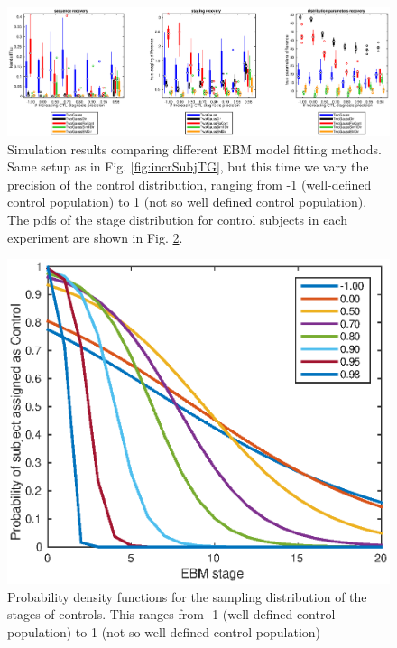 \begin{figure}[H]
 \hspace{-2cm}
 \includegraphics[scale=\simFigScale]{images/ebm/synthetic/metricsTwoGauss_incrCtlPrec.eps}
 \caption{Simulation results comparing different EBM model fitting methods. Same setup as in Fig. \ref{fig:incrSubjTG}, but this time we vary the precision of the control distribution, ranging from -1 (well-defined control population) to 1 (not so well defined control population). The pdfs of the stage distribution for control subjects in each experiment are shown in Fig. \ref{fig:ctlPrecCurvesTG}. }
  \label{fig:incrCtlPrecTG}
\end{figure}

\begin{figure}[H]
 \centering
 \hspace{-2cm}
 \includegraphics[scale=\simFigScale]{images/ebm/synthetic/ctlPrecCurves.eps}
 \caption{Probability density functions for the sampling distribution of the stages of controls. This ranges from -1 (well-defined control population) to 1 (not so well defined control population)}
 \label{fig:ctlPrecCurvesTG}
\end{figure}